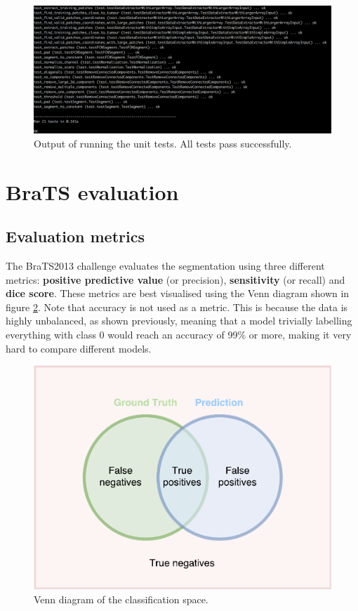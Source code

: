 \documentclass[12pt,a4paper,twoside,openright]{report}
\begin{document}
\begin{figure}[h]
	\centering
	\includegraphics[width = \textwidth]{unit_test_output}
	\caption{Output of running the unit tests. All tests pass successfully.}
	\label{fig:unit_test_output}
\end{figure}

\section{BraTS evaluation}
\subsection{Evaluation metrics}
The BraTS2013 challenge \cite{brats-proceedings} evaluates the segmentation using three different metrics: \textbf{positive predictive value} (or precision), \textbf{sensitivity} (or recall) and \textbf{dice score}. These metrics are best visualised using the Venn diagram shown in figure \ref{fig:evaluation_venn_diagram}.  Note that accuracy is not used as a metric. This is because the data is highly unbalanced, as shown previously, meaning that a model trivially labelling everything with class 0 would reach an accuracy of 99\% or more, making it very hard to compare different models.

\begin{figure}
	\centering
	\includegraphics[scale = 0.5]{evaluation_venn_diagram}
	\caption{Venn diagram of the classification space.}
	\label{fig:evaluation_venn_diagram}
\end{figure}
\end{document}
